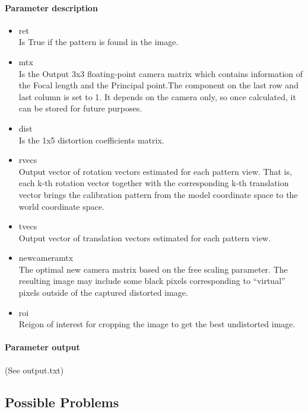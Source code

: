 \documentclass{scrartcl}
\begin{document}
\paragraph{Parameter description}
\begin{itemize}
\item ret\\
Is True if the pattern is found in the image.

\item mtx\\
Is the Output 3x3 floating-point camera matrix which contains information of the Focal length and the Principal point.The component on the last row and last column is set to 1.
It depends on the camera only, so once calculated, it can be stored for future purposes.
\item dist\\
Is the 1x5 distortion coefficients matrix.
\item rvecs\\
Output vector of rotation vectors estimated for each pattern view. That is, each k-th rotation vector together with the corresponding k-th translation vector brings the calibration pattern from the model coordinate space to the world coordinate space.
\item tvecs\\
Output vector of translation vectors estimated for each pattern view.
\item newcameramtx\\
The optimal new camera matrix based on the free scaling parameter. The resulting image may include some black pixels corresponding to “virtual” pixels outside of the captured distorted image.
\item roi\\
Reigon of interest for cropping the image to get the best undistorted image.
\end{itemize}

\paragraph{Parameter output}
(See output.txt)


\subsection{Possible Problems}
\end{document}
